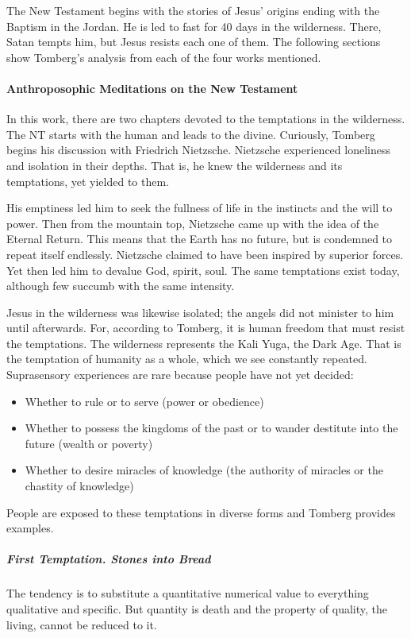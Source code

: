 The New Testament begins with the stories of Jesus' origins ending with the Baptism in the Jordan. He is led to fast for 40 days in the wilderness. There, Satan tempts him, but Jesus resists each one of them. The following sections show Tomberg's analysis from each of the four works mentioned.

\paragraph{Anthroposophic Meditations on the New Testament}
In this work, there are two chapters devoted to the temptations in the wilderness. The NT starts with the human and leads to the divine. Curiously, Tomberg begins his discussion with Friedrich Nietzsche. Nietzsche experienced loneliness and isolation in their depths. That is, he knew the wilderness and its temptations, yet yielded to them.

His emptiness led him to seek the fullness of life in the instincts and the will to power. Then from the mountain top, Nietzsche came up with the idea of the Eternal Return. This means that the Earth has no future, but is condemned to repeat itself endlessly. Nietzsche claimed to have been inspired by superior forces. Yet then led him to devalue God, spirit, soul. The same temptations exist today, although few succumb with the same intensity.

Jesus in the wilderness was likewise isolated; the angels did not minister to him until afterwards. For, according to Tomberg, it is human freedom that must resist the temptations. The wilderness represents the Kali Yuga, the Dark Age. That is the temptation of humanity as a whole, which we see constantly repeated. Suprasensory experiences are rare because people have not yet decided:

\begin{itemize}
\item Whether to rule or to serve (power or obedience) 
\item Whether to possess the kingdoms of the past or to wander destitute into the future (wealth or poverty) 
\item Whether to desire miracles of knowledge (the authority of miracles or the chastity of knowledge) 
\end{itemize}
People are exposed to these temptations in diverse forms and Tomberg provides examples.

\subparagraph{First Temptation. Stones into Bread}
The tendency is to substitute a quantitative numerical value to everything qualitative and specific. But quantity is death and the property of quality, the living, cannot be reduced to it.

